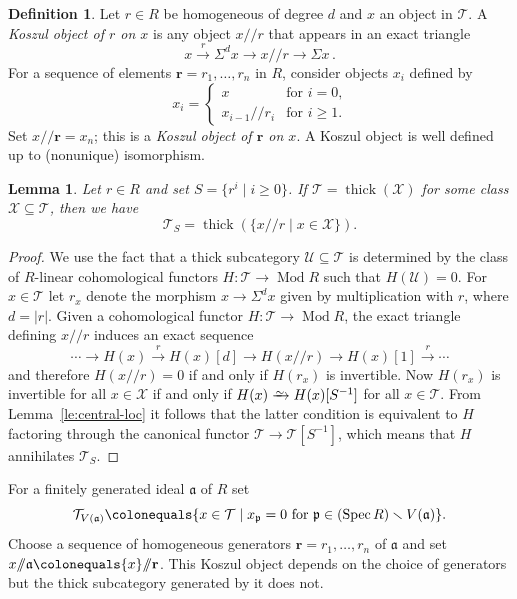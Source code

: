 \documentclass{amsart}[a4]
\newtheorem{lemma}[theorem]{Lemma}
\theoremstyle{definition}
\newtheorem{definition}[theorem]{Definition}
\theoremstyle{remark}
\numberwithin{equation}{section}
\newcommand{\Mod}{\operatorname{Mod}}
\newcommand{\Spec}{\operatorname{Spec}}
\newcommand{\thick}{\operatorname{thick}}
\newcommand{\iso}{\xrightarrow{\raisebox{-.6ex}[0ex][0ex]{$\scriptstyle{\sim}$}}}
\newcommand{\kos}[2]{{#1}/\!\!/{#2}}
\newcommand{\lto}{\longrightarrow}
\newcommand{\cat}{\mathcal}
\newcommand{\fa}{\mathfrak{a}}
\newcommand{\fp}{\mathfrak{p}}
\newcommand{\Si}{\Sigma}
\let\Sigma\varSigma
\begin{document}
\begin{definition}
  Let $r\in R$ be homogeneous of degree $d$ and $x$ an object in
  $\cat T $.  A \emph{Koszul object of $r$ on $x$} is any object
  $\kos xr$ that appears in an exact triangle
\[ x\stackrel{r}\lto \Si^{d}x\lto \kos xr \lto \Si x\,.
\] 
For a sequence of elements $\mathbf r=r_1,\ldots,r_n$ in $R$, consider
objects $x_i$ defined by
\begin{equation*}
\label{eq:koszul} x_i = \begin{cases} x & \text{for $i=0$,}\\
\kos{x_{i-1}}{r_i} & \text{for $i\geq 1$.}
\end{cases}
\end{equation*} Set $\kos x{\mathbf r} = x_n$; this is a \emph{Koszul object
  of $\mathbf r$ on $x$}.
A Koszul object is well defined up to (nonunique) isomorphism.
\end{definition}

\begin{lemma}\label{le:Koszul-r}
  Let $r\in R$  and set $S=\{r^i\mid i\ge 0\}$.  If
  $\cat T=\thick(\cat X)$ for some class $\cat X\subseteq \cat T$,
  then we have \[\cat T_S=\thick(\{\kos xr\mid x\in\cat X\}).\]
\end{lemma}
\begin{proof}
  We use the fact that a thick subcategory $\cat U\subseteq\cat T$ is
  determined by the class of $R$-linear cohomological functors
  $H\colon \cat T\to\Mod R$ such that $H(\cat U)=0$. For $x\in\cat T$
  let $r_x$ denote the morphism $x\to\Si^{d} x$ given by
  multiplication with $r$, where $d=|r|$. Given a cohomological functor
  $H\colon \cat T\to\Mod R$, the exact triangle defining $\kos xr$
  induces an exact sequence
  \[\cdots \lto H(x)\stackrel{r}\lto H(x)[d]\lto H(\kos xr)\lto H(x)[1]\stackrel{r}\lto\cdots\]
  and therefore $H(\kos xr)=0$ if and only if $H(r_x)$ is
  invertible. Now $H(r_x)$ is invertible for all $x\in\cat X$ if and
  only if $H(x)\iso H(x)[S^{-1}]$ for all $x\in\cat T$. From
  Lemma~\ref{le:central-loc} it follows that the latter condition is
  equivalent to $H$ factoring through the canonical functor
  $\cat T\to \cat T[S^{-1}]$, which means that $H$ annihilates
  $\cat T_S$.
\end{proof}

For a finitely generated ideal $\fa$ of $R$ set
\[\cat T_{V(\fa)}\colonequals\{x\in\cat T\mid x_\fp=0 \text{ for } \fp\in (\Spec
  R)\smallsetminus V(\fa)\}.\] Choose a sequence of homogeneous generators
$\mathbf r =r_1,\ldots,r_n$ of $\fa$ and set $\kos x{\fa}\colonequals\kos
x{\mathbf r}$. This Koszul object depends on the choice of generators but
the thick subcategory generated by it does not.
\end{document}
